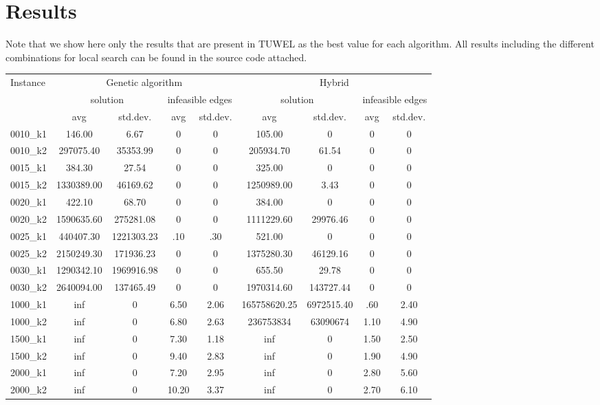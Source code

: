 \documentclass{article}
\begin{document}
\section*{Results}
Note that we show here only the results that are present in TUWEL as the best value for each algorithm. All results including the different combinations for local search can be found in the source code attached.
\small
\begin{center}
\begin{tabular}{|l|c|c|c|c|c|c|c|c|}
\hline
\multirow{3}{*}{Instance}& \multicolumn{4}{c}{Genetic algorithm} & \multicolumn{4}{c}{Hybrid} \\
& \multicolumn{2}{c}{solution} & \multicolumn{2}{c}{infeasible edges} & \multicolumn{2}{c}{solution} & \multicolumn{2}{c}{infeasible edges} \\
& avg & std.dev. & avg & std.dev. & avg & std.dev. & avg & std.dev. \\
\hline
0010\_k1 & 146.00 & 6.67 & 0 & 0 & 105.00 & 0 & 0 & 0\\
0010\_k2 & 297075.40 & 35353.99 & 0 & 0 & 205934.70 & 61.54 & 0 & 0\\
0015\_k1 & 384.30 & 27.54 & 0 & 0 & 325.00 & 0 & 0 & 0\\
0015\_k2 & 1330389.00 & 46169.62 & 0 & 0 & 1250989.00 & 3.43 & 0 & 0\\
0020\_k1 & 422.10 & 68.70 & 0 & 0 & 384.00 & 0 & 0 & 0\\
0020\_k2 & 1590635.60 & 275281.08 & 0 & 0 & 1111229.60 & 29976.46 & 0 & 0\\
0025\_k1 & 440407.30 & 1221303.23 & .10 & .30 & 521.00 & 0 & 0 & 0\\
0025\_k2 & 2150249.30 & 171936.23 & 0 & 0 & 1375280.30 & 46129.16 & 0 & 0\\
0030\_k1 & 1290342.10 & 1969916.98 & 0 & 0 & 655.50 & 29.78 & 0 & 0\\
0030\_k2 & 2640094.00 & 137465.49 & 0 & 0 & 1970314.60 & 143727.44 & 0 & 0\\
1000\_k1 & inf & 0 & 6.50 & 2.06 & 165758620.25 & 6972515.40 & .60 & 2.40\\
1000\_k2 & inf & 0 & 6.80 & 2.63 & 236753834 & 63090674 & 1.10 & 4.90\\
1500\_k1 & inf & 0 & 7.30 & 1.18 & inf & 0 & 1.50 & 2.50\\
1500\_k2 & inf & 0 & 9.40 & 2.83 & inf & 0 & 1.90 & 4.90\\
2000\_k1 & inf & 0 & 7.20 & 2.95 & inf & 0 & 2.80 & 5.60\\
2000\_k2 & inf & 0 & 10.20 & 3.37 & inf & 0 & 2.70 & 6.10\\

\end{tabular}
\end{center}
\end{document}
